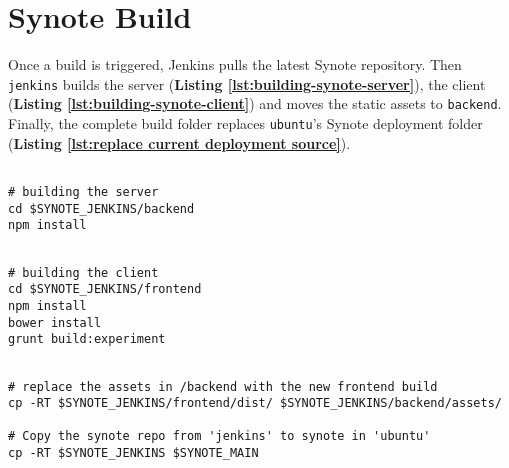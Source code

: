 \section{Synote Build}
\label{sec:synote-build}

Once a build is triggered, Jenkins pulls the latest Synote repository. Then \texttt{jenkins} builds the server (\textbf{Listing \ref{lst:building-synote-server}}), the client (\textbf{Listing \ref{lst:building-synote-client}}) and moves the static assets to \texttt{backend}. Finally, the complete build folder replaces \texttt{ubuntu}'s Synote deployment folder (\textbf{Listing \ref{lst:replace current deployment source}}).

\begin{listing}[H]
\begin{verbatim}

# building the server
cd $SYNOTE_JENKINS/backend
npm install

\end{verbatim}
\label{lst:building-synote-server}
\end{listing}

\begin{listing}[H]
\begin{verbatim}

# building the client
cd $SYNOTE_JENKINS/frontend
npm install
bower install
grunt build:experiment

\end{verbatim}
\label{lst:building-synote-client}
\end{listing}

\begin{listing}[H]
\begin{verbatim}

# replace the assets in /backend with the new frontend build
cp -RT $SYNOTE_JENKINS/frontend/dist/ $SYNOTE_JENKINS/backend/assets/

# Copy the synote repo from 'jenkins' to synote in 'ubuntu'
cp -RT $SYNOTE_JENKINS $SYNOTE_MAIN

\end{verbatim}
\label{lst:replace current deployment source}
\end{listing}

